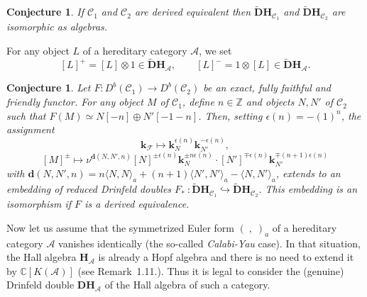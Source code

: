 \documentclass[a4paper,10pt]{amsart}
\def\Z{\mathbb{Z}}
\def\H{\mathbf{H}}
\def\C{\mathbb{C}}
\def\A{\mathcal{A}}
\newtheorem{conj}[theo]{Conjecture}
\numberwithin{equation}{section}
\begin{document}
{\vspace{.1in}

\begin{conj}\label{Conj:1} If $\mathcal{C}_1$ and $\mathcal{C}_2$ are derived equivalent then
$\widetilde{\mathbf{D}}{\H}_{\mathcal{C}_1}$ and $\widetilde{\mathbf{D}}{\H}_{\mathcal{C}_2}$ are isomorphic \textit{as algebras}.
\end{conj}

\vspace{.1in}

For any object $L$ of a hereditary category $\A$, we set
$$[L]^+=[L] \otimes 1 \in \widetilde{\mathbf{D}}\H_{\A}, \qquad [L]^-=1 \otimes [L] \in \widetilde{\mathbf{D}}\H_{\A}.$$

\vspace{.1in}

\begin{conj}\label{Conj:2} Let $F: D^b(\mathcal{C}_1) \to D^b(\mathcal{C}_2)$ be an exact, fully faithful and friendly functor. For any object $M$ of $\mathcal{C}_1$, define $n \in \Z$ and objects $N, N'$ of $\mathcal{C}_2$ such that $F(M) \simeq N[-n] \oplus N'[-1-n]$. Then, setting $\epsilon(n)=-(1)^n$, the assignment
\begin{equation}\label{E:juki1}
\mathbf{k}_{\mathcal{F}} \mapsto \mathbf{k}_{N}^{\epsilon(n)}\mathbf{k}_{N'}^{-\epsilon(n)},
\end{equation}
\begin{equation}\label{E:juki2}
[M]^{\pm} \mapsto \nu^{\mathbf{d}(N,N',n)} [N]^{\pm \epsilon(n)} \mathbf{k}^{\pm n \epsilon(n)}_{N} \cdot [N']^{\mp \epsilon(n)} \mathbf{k}_{N'}^{\mp (n+1)\epsilon(n)}
\end{equation}
with $\mathbf{d}(N,N',n)=n\langle N,N\rangle_a+(n+1)\langle N',N'\rangle_a-\langle N,N'\rangle_a$,
extends to an embedding of reduced Drinfeld doubles $F_*~: \widetilde{\mathbf{D}}\H_{\mathcal{C}_1} \hookrightarrow \widetilde{\mathbf{D}}\H_{\mathcal{C}_2}$. This embedding is an isomorphism if $F$ is a derived equivalence.\end{conj}

\vspace{.1in}

Now let us assume that the symmetrized Euler form $(\;,\;)_a$ of a hereditary category $\A$ vanishes identically (the so-called \textit{Calabi-Yau} case). In that situation, the Hall algebra $\H_\A$ is already a Hopf algebra and there is no need to extend it by $\C[K(\A)]$ (see Remark~1.11.). Thus it is legal to consider the (genuine) Drinfeld double $\mathbf{D}\H_{\A}$ of the Hall algebra of such a category.

}
\end{document}

